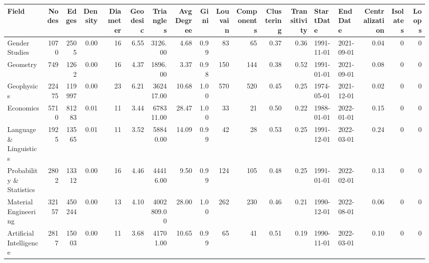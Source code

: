 \begin{tabular}{lrrrrrrrrrrrrllrrr}
\toprule
                          Field &  Nodes &  Edges &  Density &  Diameter &  Geodesic &  Triangles &  AvgDegree &  Gini &  Louvain &  Components &  Clustering &  Transitivity &  StartDate &    EndDate &  Centralization &  Isolates &  Loops \\
\midrule
                 Gender Studies &   1070 &   2505 &     0.00 &        16 &      6.55 &    3126.00 &       4.68 &  0.99 &       83 &          65 &        0.37 &          0.36 & 1991-11-01 & 2021-09-01 &            0.04 &         0 &      0 \\
                       Geometry &    749 &   1262 &     0.00 &        16 &      4.37 &    1896.00 &       3.37 &  0.98 &      150 &         144 &        0.38 &          0.52 & 1991-01-01 & 2021-09-01 &            0.08 &         0 &      0 \\
                     Geophysics &  22475 & 119997 &     0.00 &        23 &      6.21 &  362417.00 &      10.68 &  1.00 &      570 &         520 &        0.45 &          0.25 & 1974-05-01 & 2021-12-01 &            0.02 &         0 &      0 \\
                      Economics &   5710 &  81283 &     0.01 &        11 &      3.44 &  678311.00 &      28.47 &  1.00 &       33 &          21 &        0.50 &          0.22 & 1988-01-01 & 2022-01-01 &            0.15 &         0 &      0 \\
         Language \& Linguistics &   1925 &  13565 &     0.01 &        11 &      3.52 &   58840.00 &      14.09 &  0.99 &       42 &          28 &        0.53 &          0.25 & 1991-12-01 & 2022-03-01 &            0.24 &         0 &      0 \\
       Probability \& Statistics &   2802 &  13312 &     0.00 &        16 &      4.46 &   44416.00 &       9.50 &  0.99 &      124 &         105 &        0.48 &          0.25 & 1991-01-01 & 2022-02-01 &            0.13 &         0 &      0 \\
           Material Engineering &  32157 & 450244 &     0.00 &        13 &      4.10 & 4002809.00 &      28.00 &  1.00 &      262 &         230 &        0.46 &          0.21 & 1990-12-01 & 2022-08-01 &            0.06 &         0 &      0 \\
        Artificial Intelligence &   2817 &  15003 &     0.00 &        11 &      3.68 &   41701.00 &      10.65 &  0.99 &       65 &          41 &        0.51 &          0.19 & 1990-11-01 & 2022-03-01 &            0.10 &         0 &      0 \\

\end{tabular}
